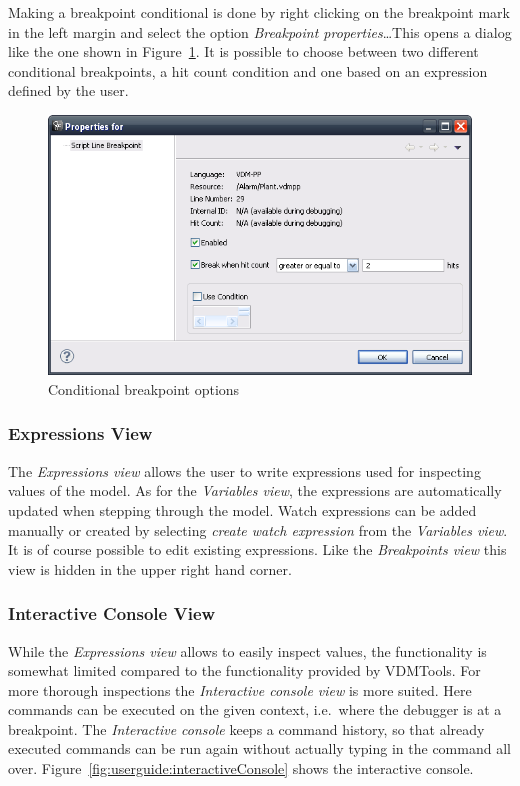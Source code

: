\documentclass{overturerepsec}
\begin{document}
Making a breakpoint conditional is done by right clicking on the breakpoint
mark in the left margin and select the option \emph{Breakpoint properties}\ldots This
opens a dialog like the one shown in
Figure~\ref{fig:userguide:BreakpointConditional}. It is possible to choose
between two different conditional breakpoints, a hit count condition and one
based on an expression defined by the user. 

\begin{figure}[htp]
\begin{center}
  \includegraphics[width=.6\textwidth]{figures/Breakpointconditional}
  \caption{Conditional breakpoint options}
  \label{fig:userguide:BreakpointConditional}
\end{center}
\end{figure}

\subsubsection{Expressions View}

The \emph{Expressions view} allows the user to write expressions used for inspecting
values of the model. As for the \emph{Variables view}, the expressions are 
automatically updated when stepping through the model.
Watch expressions can be added manually or created by selecting \emph{create watch
expression} from the \emph{Variables view}. It is of course possible to edit existing
expressions. Like the \emph{Breakpoints view} this view is hidden in the upper right
hand corner.

\subsubsection{Interactive Console View}

While the \emph{Expressions view} allows to easily inspect values, the functionality is
somewhat limited compared to the functionality provided by VDMTools. For more
thorough inspections the \emph{Interactive console view} is more suited. Here commands
can be executed on the given context, i.e.\ where the debugger is at a
breakpoint. The \emph{Interactive console} keeps a command history, so that already
executed commands can be run again without actually typing in the command all
over. Figure~\ref{fig:userguide:interactiveConsole} shows the interactive
console.
\end{document}
